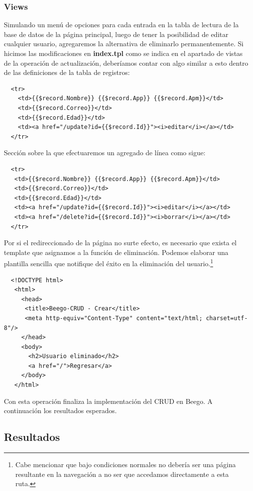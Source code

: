 \documentclass[12pt]{article}
\begin{document}
\subsubsection{Views}
Simulando un menú de opciones para cada entrada en la tabla de lectura de la base
de datos de la página principal, luego de tener la posibilidad de editar cualquier
usuario, agregaremos la alternativa de eliminarlo permanentemente.
Si hicimos las modificaciones en \textbf{index.tpl} como se indica en el apartado de
vistas de la operación de actualización, deberíamos contar con algo similar a esto
dentro de las definiciones de la tabla de registros:
\begin{verbatim}
  <tr>
    <td>{{$record.Nombre}} {{$record.App}} {{$record.Apm}}</td>
    <td>{{$record.Correo}}</td>
    <td>{{$record.Edad}}</td>
    <td><a href="/update?id={{$record.Id}}"><i>editar</i></a></td>
  </tr>
\end{verbatim}
Sección sobre la que efectuaremos un agregado de línea como sigue:
\begin{verbatim}
  <tr>
   <td>{{$record.Nombre}} {{$record.App}} {{$record.Apm}}</td>
   <td>{{$record.Correo}}</td>
   <td>{{$record.Edad}}</td>
   <td><a href="/update?id={{$record.Id}}"><i>editar</i></a></td>
   <td><a href="/delete?id={{$record.Id}}"><i>borrar</i></a></td>
  </tr>
\end{verbatim}
Por si el redireccionado de la página no surte efecto, es necesario que
exista el template que asignamos a la función de eliminación.
Podemos elaborar una plantilla sencilla que notifique del éxito en la
eliminación del usuario.\footnote{Cabe mencionar que bajo condiciones
  normales no debería ser una página resultante en la navegación a no ser
  que accedamos directamente a esta ruta.}
\begin{verbatim}
  <!DOCTYPE html>
   <html>
     <head>
      <title>Beego-CRUD - Crear</title>
      <meta http-equiv="Content-Type" content="text/html; charset=utf-8"/>
     </head>
     <body>
       <h2>Usuario eliminado</h2>
       <a href="/">Regresar</a>
     </body>
   </html>
\end{verbatim}
Con esta operación finaliza la implementación del CRUD en Beego.
A continuación los resultados esperados.
\subsection{Resultados}
\end{document}
